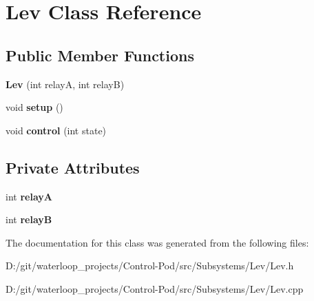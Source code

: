 \hypertarget{class_lev}{}\section{Lev Class Reference}
\label{class_lev}
\subsection*{Public Member Functions}
\begin{DoxyCompactItemize}
\item 
\mbox{\label{class_lev_a2ca7a6f89860908b9e8c50282c09ce84}} 
{\bfseries Lev} (int relayA, int relayB)
\item 
\mbox{\label{class_lev_ab1cc62d38fbf7a8c9f52fb345282ccaf}} 
void {\bfseries setup} ()
\item 
\mbox{\label{class_lev_ac5bb247627c230eec2412670bebec42c}} 
void {\bfseries control} (int state)
\end{DoxyCompactItemize}
\subsection*{Private Attributes}
\begin{DoxyCompactItemize}
\item 
\mbox{\label{class_lev_a9491aac135064aaf0927f808744e56ff}} 
int {\bfseries relayA}
\item 
\mbox{\label{class_lev_ad1f05031fff549920c9cb8a3721cd060}} 
int {\bfseries relayB}
\end{DoxyCompactItemize}


The documentation for this class was generated from the following files\+:\begin{DoxyCompactItemize}
\item 
D\+:/git/waterloop\+\_\+projects/\+Control-\/\+Pod/src/\+Subsystems/\+Lev/Lev.\+h\item 
D\+:/git/waterloop\+\_\+projects/\+Control-\/\+Pod/src/\+Subsystems/\+Lev/Lev.\+cpp\end{DoxyCompactItemize}
